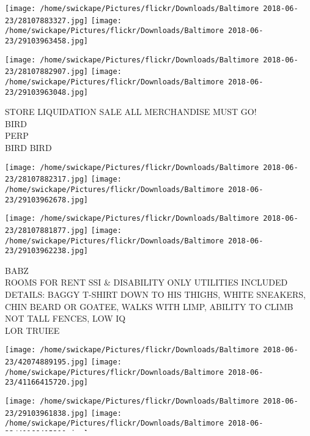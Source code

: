 \documentclass[10pt,letterpaper]{article}
\begin{document}
\texttt{[image: /home/swickape/Pictures/flickr/Downloads/Baltimore 2018-06-23/28107883327.jpg]}
\texttt{[image: /home/swickape/Pictures/flickr/Downloads/Baltimore 2018-06-23/29103963458.jpg]}

\texttt{[image: /home/swickape/Pictures/flickr/Downloads/Baltimore 2018-06-23/28107882907.jpg]}
\texttt{[image: /home/swickape/Pictures/flickr/Downloads/Baltimore 2018-06-23/29103963048.jpg]}

STORE LIQUIDATION SALE ALL MERCHANDISE MUST GO!\\
BIRD\\
PERP\\
BIRD BIRD
\pagebreak

\texttt{[image: /home/swickape/Pictures/flickr/Downloads/Baltimore 2018-06-23/28107882317.jpg]}
\texttt{[image: /home/swickape/Pictures/flickr/Downloads/Baltimore 2018-06-23/29103962678.jpg]}

\texttt{[image: /home/swickape/Pictures/flickr/Downloads/Baltimore 2018-06-23/28107881877.jpg]}
\texttt{[image: /home/swickape/Pictures/flickr/Downloads/Baltimore 2018-06-23/29103962238.jpg]}

BABZ\\
ROOMS FOR RENT SSI \& DISABILITY ONLY UTILITIES INCLUDED\\
DETAILS: BAGGY T{-}SHIRT DOWN TO HIS THIGHS, WHITE SNEAKERS, CHIN BEARD OR GOATEE, WALKS WITH LIMP, ABILITY TO CLIMB NOT TALL FENCES, LOW IQ\\
LOR TRUIEE
\pagebreak

\texttt{[image: /home/swickape/Pictures/flickr/Downloads/Baltimore 2018-06-23/42074889195.jpg]}
\texttt{[image: /home/swickape/Pictures/flickr/Downloads/Baltimore 2018-06-23/41166415720.jpg]}

\texttt{[image: /home/swickape/Pictures/flickr/Downloads/Baltimore 2018-06-23/29103961838.jpg]}
\texttt{[image: /home/swickape/Pictures/flickr/Downloads/Baltimore 2018-06-23/41166415210.jpg]}

BIRD\\
E\\
BIRD\\
THAT
\pagebreak

\texttt{[image: /home/swickape/Pictures/flickr/Downloads/Baltimore 2018-06-23/29103961458.jpg]}
\texttt{[image: /home/swickape/Pictures/flickr/Downloads/Baltimore 2018-06-23/41166414720.jpg]}
\end{document}
